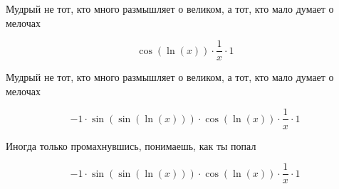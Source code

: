 \documentclass[a4paper,12pt]{article}
\begin{document}
\begin{center}
Мудрый не тот, кто много размышляет о великом, а тот, кто мало думает о мелочах
\end{center}


\begin{center}
\begin{equation}
\cos(\ln(x)) \cdot  \frac{1 }{ x }  \cdot 1
\end{equation}
\end{center}

\begin{center}
Мудрый не тот, кто много размышляет о великом, а тот, кто мало думает о мелочах
\end{center}


\begin{center}
\begin{equation}
-1 \cdot \sin(\sin(\ln(x))) \cdot \cos(\ln(x)) \cdot  \frac{1 }{ x }  \cdot 1
\end{equation}
\end{center}

\begin{center}
Иногда только промахнувшись, понимаешь, как ты попал
\end{center}


\begin{center}
\begin{equation}
-1 \cdot \sin(\sin(\ln(x))) \cdot \cos(\ln(x)) \cdot  \frac{1 }{ x }  \cdot 1
\end{equation}
\end{center}
\end{document}
